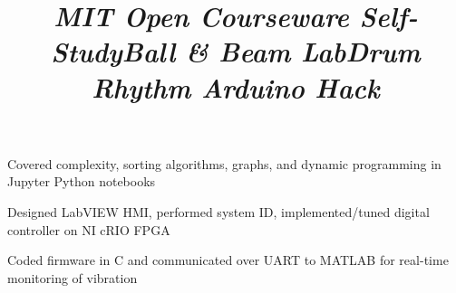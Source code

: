 \documentclass[mm]{res}
\begin{document}
\begin{resume}
\title{\textsl{MIT Open Courseware Self-Study}}
\begin{position}
\tb Covered complexity, sorting algorithms, graphs, and dynamic programming in Jupyter Python notebooks
\end{position}


\title{\textsl{Ball \& Beam Lab}}
\begin{position}
\tb Designed LabVIEW HMI, performed system ID, implemented/tuned digital controller on NI cRIO FPGA
\end{position}


\title{\textsl{Drum Rhythm Arduino Hack}}
\begin{position}
\tb Coded firmware in C and communicated over UART to MATLAB for real-time monitoring of vibration
\end{position}




\end{resume}
\end{document}
